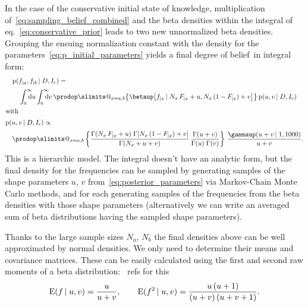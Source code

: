 \documentclass[\ifafour a4paper,12pt,\else a5paper,10pt,\fi%
onecolumn,oneside,article,%
british%
]{memoir}
\makeatletter
\theoremstyle{remark}
\theoremstyle{innote}
\def\prod{\DOTSI\prodop\slimits@}
\newcommand*{\di}{\mathrm{d}}%
\newcommand*{\pf}{\mathrm{p}}%
\newcommand*{\E}{\mathrm{E}}
\renewcommand*{\|}[1][]{\nonscript\,#1\vert\nonscript\;\mathopen{}}
\newcommand*{\eqn}{eq.}%
\newcommand*{\puzzle}{{\fontencoding{U}\fontfamily{fontawesometwo}\selectfont\symbol{225}}}
\newcommand{\mynote}[1]{ {\color{notecolour}\puzzle\ #1}}
\newcommand*{\dob}{degree of belief}
\newcommand*{\yD}{D}
\newcommand*{\yI}{I}
\newcommand*{\yIc}{\yI_\text{c}}
\newcommand*{\ya}{a}
\newcommand*{\yb}{b}
\newcommand*{\dbeta}{\betaup}
\newcommand*{\dgamma}{\gammaup}
\newcommand*{\yua}{u}
\newcommand*{\yub}{v}
\makeatother
\begin{document}
In the case of the conservative initial state of knowledge, multiplication
of~\eqref{eq:sampling_belief_combined} and the beta densities within the
integral of \eqn~\eqref{eq:conservative_prior} leads to two new
unnormalized beta densities. Grouping the ensuing normalization constant
with the density for the parameters~\eqref{eq:p_initial_parameters} yields
a final \dob\ in integral form:
\begin{subequations}
  \label{eq:final_from_conservative}
  \begin{gather}
  \begin{multlined}[t][\linewidth]
    \pf(f_{|\ya}, f_{|\yb} \| \yD, \yIc)
    ={}\\[\jot]
    \int_{\mathrlap{0}}^{\mathrlap{\infty}}\di\yua
    \int_{\mathrlap{0}}^{\mathrlap{\infty}}\di\yub\,
    \prod_{x=\ya,\yb}\bigl\{ 
    \dbeta\bigl[f_{|x} \| N_{x}\,F_{|x} +\yua, N_{x}\,(1-F_{|x})+\yub\bigr]
    \bigr\}\, \pf(\yua,\yub \| \yD,\yIc)
  \end{multlined}\\
  \shortintertext{with}
      \label{eq:posterior_parameters}
  \begin{multlined}[t][\linewidth]
    \pf(\yua,\yub \| \yD,\yIc) \propto{}\\[\jot]
    \prod_{x=\ya,\yb}\left\{
      \frac{\Gamma(N_{x}\,F_{|x}+\yua)\;\Gamma[N_{x}\,(1-F_{|x})+\yub]}
      {\Gamma(N_{x}+\yua+\yub)}\,
      \frac{\Gamma(\yua+\yub)}
      {\Gamma(\yua)\;\Gamma(\yub)} \right\}
    \,\frac{\dgamma(\yua+\yub \| 1, 1000)}{\yua+\yub}.
  \end{multlined}
\end{gather}
\end{subequations}
This is a hierarchic model. The integral doesn't have an analytic form, but
the final density for the frequencies can be sampled by generating samples
of the shape parameters $\yua$, $\yub$ from~\eqref{eq:posterior_parameters}
via Markov-Chain Monte Carlo methods, and for each generating samples of
the frequencies from the beta densities with those shape parameters
(alternatively we can write an averaged sum of beta distributions having the
sampled shape parameters).

\medskip

Thanks to the large sample sizes $N_{\ya}$, $N_{\yb}$ the final densities
above can be well approximated by normal densities. We only need to
determine their means and covariance matrices. These can be easily
calculated using the first and second raw moments of a beta
distribution:\mynote{refs for this}
\begin{equation}
  \label{eq:moments_beta}
  \E(f \| \yua,\yub) = \frac{\yua}{\yua+\yub},
  \qquad
  \E(f^2 \| \yua,\yub) = \frac{\yua\,(\yua+1)}{(\yua+\yub)\,(\yua+\yub+1)}.  
\end{equation}
\end{document}

